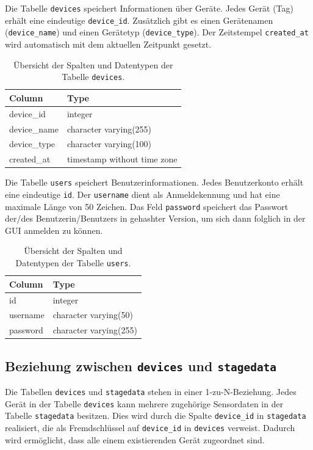Die Tabelle \texttt{devices} speichert Informationen über Geräte. Jedes Gerät (Tag) erhält eine eindeutige \texttt{device\_id}. Zusätzlich gibt es einen Gerätenamen (\texttt{device\_name}) und einen Gerätetyp (\texttt{device\_type}). Der Zeitstempel \texttt{created\_at} wird automatisch mit dem aktuellen Zeitpunkt gesetzt.
\begin{table}[h]
	\centering
	\begin{tabular}{|l|l|}
		\hline
		\textbf{Column} & \textbf{Type} \\
		\hline
		device\_id & integer \\
		\hline
		device\_name & character varying(255) \\
		\hline
		device\_type & character varying(100) \\
		\hline
		created\_at & timestamp without time zone \\
		\hline
	\end{tabular}
	\caption{Übersicht der Spalten und Datentypen der Tabelle \texttt{devices}.}
	\label{tab:devices}
\end{table}

Die Tabelle \texttt{users} speichert Benutzerinformationen. Jedes Benutzerkonto erhält eine eindeutige \texttt{id}. Der \texttt{username} dient als Anmeldekennung und hat eine maximale Länge von 50 Zeichen. Das Feld \texttt{password} speichert das Passwort  der/des Benutzerin/Benutzers in gehashter Version, um sich dann folglich in der GUI anmelden zu können.
\begin{table}[H]
	\centering
	\begin{tabular}{|l|l|}
		\hline
		\textbf{Column} & \textbf{Type} \\
		\hline
		id & integer \\
		\hline
		username & character varying(50) \\
		\hline
		password & character varying(255) \\
		\hline
	\end{tabular}
	\caption{Übersicht der Spalten und Datentypen der Tabelle \texttt{users}.}
	\label{tab:users}
\end{table}

\subsection{Beziehung zwischen \texttt{devices} und \texttt{stagedata}}

Die Tabellen \texttt{devices} und \texttt{stagedata} stehen in einer 1-zu-N-Beziehung. Jedes Gerät in der Tabelle \texttt{devices} kann mehrere zugehörige Sensordaten in der Tabelle \texttt{stagedata} besitzen. Dies wird durch die Spalte \texttt{device\_id} in \texttt{stagedata} realisiert, die als Fremdschlüssel auf \texttt{device\_id} in \texttt{devices} verweist. Dadurch wird ermöglicht, dass alle einem existierenden Gerät zugeordnet sind. 

